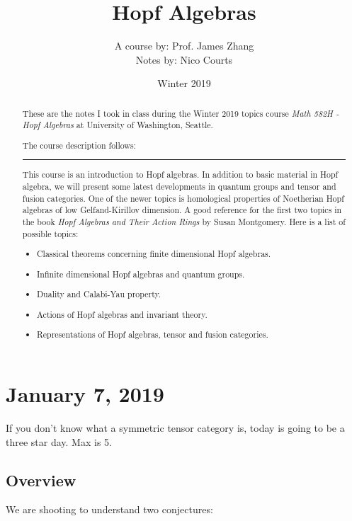 \documentclass[12pt]{article}
\theoremstyle{nonumberbreak}
\theoremstyle{changebreak}
\theoremstyle{break}
\theoremstyle{nonumberbreak}
\theoremstyle{nonumberplain}
\theoremstyle{change}
\newcommand*{\brk}{
\rule{2in}{.1pt}
}
\begin{document}
\title{Hopf Algebras\vspace{-1ex}}
\author{A course by: Prof. James Zhang\\
Notes by: Nico Courts}
\date{Winter 2019}
\maketitle

\renewcommand{\abstractname}{Introduction}
\begin{abstract}
	These are the notes I took in class during the Winter 2019 topics course
	\textit{Math 582H - Hopf Algebras} at University of Washington, Seattle. 
	
	The course description follows:

	\brk

	This course is an introduction to Hopf algebras. In addition to basic material in 
	Hopf algebra, we will present some latest developments in quantum groups and tensor 
	and fusion categories. One of the newer topics is homological properties of 
	Noetherian Hopf algebras of low Gelfand-Kirillov dimension. A good reference for 
	the first two topics in the book \textit{Hopf Algebras and Their Action Rings} by 
	Susan Montgomery. Here is a list of possible topics:

\begin{itemize}
	\item Classical theorems concerning finite dimensional Hopf algebras.
	\item Infinite dimensional Hopf algebras and quantum groups.
	\item Duality and Calabi-Yau property.
	\item Actions of Hopf algebras and invariant theory.
	\item Representations of Hopf algebras, tensor and fusion categories.
\end{itemize}
\end{abstract}

\section{January 7, 2019}
If you don't know what a symmetric tensor category is, today is going to be a three 
star day. Max is 5.

\subsection{Overview}
We are shooting to understand two conjectures:
\end{document}
